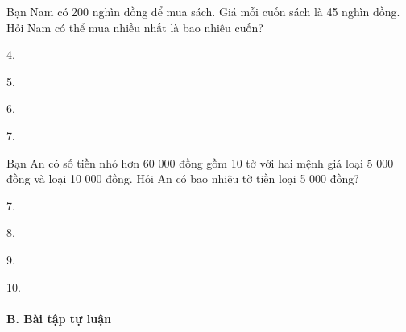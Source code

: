 \documentclass[%
    fontsize=12pt,%
    chapterprefix=false,%
    open=right,%
    twoside=false,%
    numbers=noenddot,%
    headings=optiontohead,%
    final,%
    DIV=15,%
    parskip=half %
]{scrbook}
\begin{document}
\begin{tracnghiem}
\item Bạn Nam có 200 nghìn đồng để mua sách. Giá mỗi cuốn sách là 45 nghìn đồng. Hỏi Nam có thể mua nhiều nhất là bao nhiêu cuốn?
\begin{options}
  \item 4.
  \item 5.
  \item 6.
  \item 7.
\end{options}

\item Bạn An có số tiền nhỏ hơn 60 000 đồng gồm 10 tờ với hai mệnh giá loại 5 000 đồng và loại 10 000 đồng. Hỏi An có bao nhiêu tờ tiền loại 5 000 đồng?
\begin{options}
  \item 7.
  \item 8.
  \item 9.
  \item 10.
\end{options}

\end{tracnghiem}

\paragraph{B. Bài tập tự luận}
\end{document}
